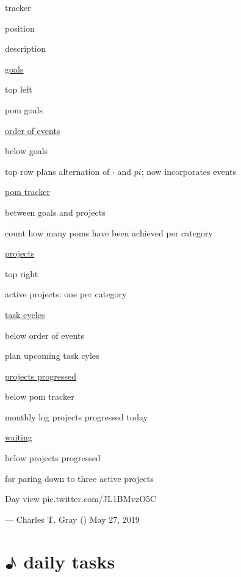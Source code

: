 \documentclass[]{book}
\newenvironment{Shaded}{\begin{snugshade}}{\end{snugshade}}
\newcommand{\CommentTok}[1]{\textcolor[rgb]{0.56,0.35,0.01}{\textit{#1}}}
\newcommand{\ControlFlowTok}[1]{\textcolor[rgb]{0.13,0.29,0.53}{\textbf{#1}}}
\newcommand{\DataTypeTok}[1]{\textcolor[rgb]{0.13,0.29,0.53}{#1}}
\newcommand{\KeywordTok}[1]{\textcolor[rgb]{0.13,0.29,0.53}{\textbf{#1}}}
\newcommand{\NormalTok}[1]{#1}
\newcommand{\OperatorTok}[1]{\textcolor[rgb]{0.81,0.36,0.00}{\textbf{#1}}}
\newcommand{\StringTok}[1]{\textcolor[rgb]{0.31,0.60,0.02}{#1}}
\begin{document}
tracker

position

description

\protect\hyperlink{dayview:goals}{goals}

top left

pom goals

\protect\hyperlink{dayview:order-of-events}{order of events}

below goals

top row plans alternation of \(\cdot\) and \(pi\); now incorporates events

\protect\hyperlink{dayview:pom-tracker}{pom tracker}

between goals and projects

count how many poms have been achieved per category

\protect\hyperlink{dayview:projects}{projects}

top right

active projects: one per category

\protect\hyperlink{dayview:task-cycles}{task cycles}

below order of events

plan upcoming task cyles

\protect\hyperlink{dayview:progressed}{projects progressed}

below pom tracker

monthly log projects progressed today

\protect\hyperlink{dayview:waiting}{waiting}

below projects progressed

for paring down to three active projects

Day view pic.twitter.com/JL1BMvzO5C

--- Charles T. Gray (\citet{cantabile}) May 27, 2019

\hypertarget{daily-tasks}{%
\section{♪ daily tasks}\label{daily-tasks}}

\begin{Shaded}
\end{Shaded}
\end{document}
